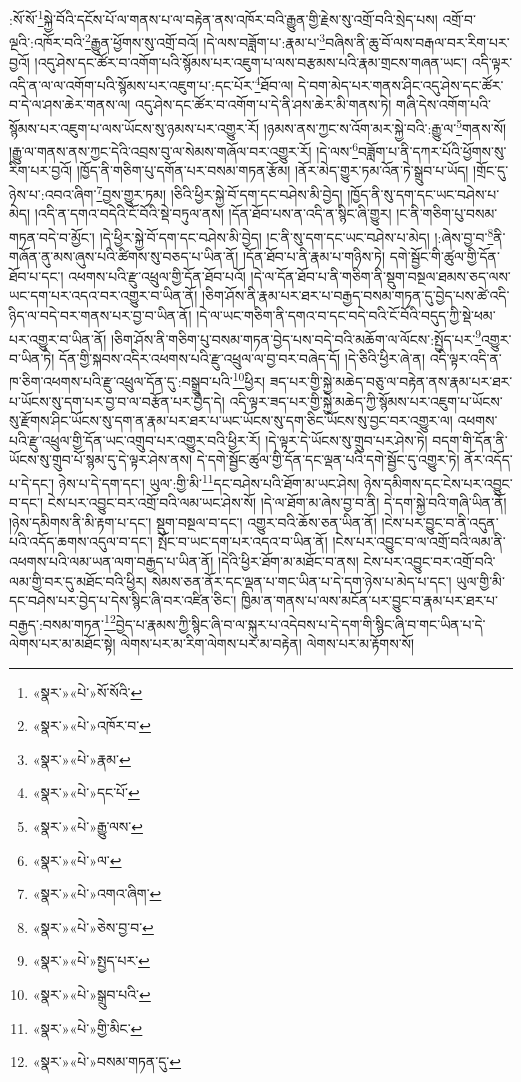 :སོ་སོ་\footnote{«སྣར་»«པེ་»སོ་སོའི་}སྐྱེ་བོའི་དངོས་པོ་ལ་གནས་པ་ལ་བརྟེན་ནས་འཁོར་བའི་རྒྱུན་གྱི་རྗེས་སུ་འགྲོ་བའི་སྲེད་པས། འགྲོ་བ་ལྔའི་:འཁོར་བའི་\footnote{«སྣར་»«པེ་»འཁོར་བ་}རྒྱུན་ཕྱོགས་སུ་འགྲོ་བའོ། །དེ་ལས་བཟློག་པ་:རྣམ་པ་\footnote{«སྣར་»«པེ་»རྣམ་}བཞིས་ནི་ཆུ་བོ་ལས་བརྒལ་བར་རིག་པར་བྱའོ། །འདུ་ཤེས་དང་ཚོར་བ་འགོག་པའི་སྙོམས་པར་འཇུག་པ་ལས་བརྩམས་པའི་རྣམ་གྲངས་གཞན་ཡང་། འདི་ལྟར་འདི་ན་ལ་ལ་འགོག་པའི་སྙོམས་པར་འཇུག་པ་:དང་པོར་\footnote{«སྣར་»«པེ་»དང་པོ་}ཐོབ་ལ། དེ་བག་མེད་པར་གནས་ཤིང་འདུ་ཤེས་དང་ཚོར་བ་དེ་ལ་ཤས་ཆེར་གནས་ལ། འདུ་ཤེས་དང་ཚོར་བ་འགོག་པ་དེ་ནི་ཤས་ཆེར་མི་གནས་ཏེ། གཞི་དེས་འགོག་པའི་སྙོམས་པར་འཇུག་པ་ལས་ཡོངས་སུ་ཉམས་པར་འགྱུར་རོ། །ཉམས་ནས་ཀྱང་ས་འོག་མར་སྐྱེ་བའི་:རྒྱུ་ལ་\footnote{«སྣར་»«པེ་»རྒྱུ་ལས་}གནས་སོ། །རྒྱུ་ལ་གནས་ནས་ཀྱང་དེའི་འབྲས་བུ་ལ་སེམས་གཞོལ་བར་འགྱུར་རོ། །དེ་ལས་\footnote{«སྣར་»«པེ་»ལ་}བཟློག་པ་ནི་དཀར་པོའི་ཕྱོགས་སུ་རིག་པར་བྱའོ། །ཁྱོད་ནི་གཅིག་པུ་དགོན་པར་བསམ་གཏན་རྩོམ། །ནོར་མེད་གྱུར་ཏམ་འོན་ཏེ་སྒྲུབ་པ་ཡོད། །གྲོང་དུ་ཉེས་པ་:འབའ་ཞིག་\footnote{«སྣར་»«པེ་»འགའ་ཞིག་}བྱས་གྱུར་ཏམ། །ཅིའི་ཕྱིར་སྐྱེ་བོ་དག་དང་བཤེས་མི་བྱེད། །ཁྱོད་ནི་སུ་དག་དང་ཡང་བཤེས་པ་མེད། །འདི་ན་དགའ་བདེའི་ངོ་བོའི་སྡེ་བཏུལ་ནས། །དོན་ཐོབ་པས་ན་འདི་ན་སྙིང་ཞི་གྱུར། །ང་ནི་གཅིག་པུ་བསམ་གཏན་བདེ་བ་མྱོང་། །དེ་ཕྱིར་སྐྱེ་བོ་དག་དང་བཤེས་མི་བྱེད། །ང་ནི་སུ་དག་དང་ཡང་བཤེས་པ་མེད། །:ཞེས་བྱ་བ་\footnote{«སྣར་»«པེ་»ཅེས་བྱ་བ་}ནི་གཞོན་ནུ་མས་ཞུས་པའི་ཚིགས་སུ་བཅད་པ་ཡིན་ནོ། །དོན་ཐོབ་པ་ནི་རྣམ་པ་གཉིས་ཏེ། དགེ་སྦྱོང་གི་ཚུལ་གྱི་དོན་ཐོབ་པ་དང་། འཕགས་པའི་རྫུ་འཕྲུལ་གྱི་དོན་ཐོབ་པའོ། །དེ་ལ་དོན་ཐོབ་པ་ནི་གཅིག་ནི་སྡུག་བསྔལ་ཐམས་ཅད་ལས་ཡང་དག་པར་འདའ་བར་འགྱུར་བ་ཡིན་ནོ། །ཅིག་ཤོས་ནི་རྣམ་པར་ཐར་པ་བརྒྱད་བསམ་གཏན་དུ་བྱེད་པས་ཚེ་འདི་ཉིད་ལ་བདེ་བར་གནས་པར་བྱ་བ་ཡིན་ནོ། །དེ་ལ་ཡང་གཅིག་ནི་དགའ་བ་དང་བདེ་བའི་ངོ་བོའི་བདུད་ཀྱི་སྡེ་ཕམ་པར་འགྱུར་བ་ཡིན་ནོ། །ཅིག་ཤོས་ནི་གཅིག་པུ་བསམ་གཏན་བྱེད་པས་བདེ་བའི་མཆོག་ལ་ལོངས་:སྤྱོད་པར་\footnote{«སྣར་»«པེ་»སྤྱད་པར་}འགྱུར་བ་ཡིན་ཏེ། དོན་གྱི་སྐབས་འདིར་འཕགས་པའི་རྫུ་འཕྲུལ་ལ་བྱ་བར་བཞེད་དོ། །དེ་ཅིའི་ཕྱིར་ཞེ་ན། འདི་ལྟར་འདི་ན་ཁ་ཅིག་འཕགས་པའི་རྫུ་འཕྲུལ་དོན་དུ་:བསྒྲུབ་པའི་\footnote{«སྣར་»«པེ་»སྒྲུབ་པའི་}ཕྱིར། ཟད་པར་གྱི་སྐྱེ་མཆེད་བཅུ་ལ་བརྟེན་ནས་རྣམ་པར་ཐར་པ་ཡོངས་སུ་དག་པར་བྱ་བ་ལ་བརྩོན་པར་བྱེད་དེ། འདི་ལྟར་ཟད་པར་གྱི་སྐྱེ་མཆེད་ཀྱི་སྙོམས་པར་འཇུག་པ་ཡོངས་སུ་རྫོགས་ཤིང་ཡོངས་སུ་དག་ན་རྣམ་པར་ཐར་པ་ཡང་ཡོངས་སུ་དག་ཅིང་ཡོངས་སུ་བྱང་བར་འགྱུར་ལ། འཕགས་པའི་རྫུ་འཕྲུལ་གྱི་དོན་ཡང་འགྲུབ་པར་འགྱུར་བའི་ཕྱིར་རོ། །དེ་ལྟར་དེ་ཡོངས་སུ་གྲུབ་པར་ཤེས་ཏེ། བདག་གི་དོན་ནི་ཡོངས་སུ་གྲུབ་པོ་སྙམ་དུ་དེ་ལྟར་ཤེས་ནས། དེ་དགེ་སྦྱོང་ཚུལ་གྱི་དོན་དང་ལྡན་པའི་དགེ་སྦྱོང་དུ་འགྱུར་ཏེ། ནོར་འདོད་པ་དེ་དང་། ཉེས་པ་དེ་དག་དང་། ཡུལ་:གྱི་མི་\footnote{«སྣར་»«པེ་»གྱི་མིང་}དང་བཤེས་པའི་ཐོག་མ་ཡང་ཤེས། ཉེས་དམིགས་དང་ངེས་པར་འབྱུང་བ་དང་། ངེས་པར་འབྱུང་བར་འགྲོ་བའི་ལམ་ཡང་ཤེས་སོ། །དེ་ལ་ཐོག་མ་ཞེས་བྱ་བ་ནི། དེ་དག་སྐྱེ་བའི་གཞི་ཡིན་ནོ། །ཉེས་དམིགས་ནི་མི་རྟག་པ་དང་། སྡུག་བསྔལ་བ་དང་། འགྱུར་བའི་ཆོས་ཅན་ཡིན་ནོ། །ངེས་པར་བྱུང་བ་ནི་འདུན་པའི་འདོད་ཆགས་འདུལ་བ་དང་། སྤོང་བ་ཡང་དག་པར་འདའ་བ་ཡིན་ནོ། །ངེས་པར་འབྱུང་བ་ལ་འགྲོ་བའི་ལམ་ནི་འཕགས་པའི་ལམ་ཡན་ལག་བརྒྱད་པ་ཡིན་ནོ། །དེའི་ཕྱིར་ཐོག་མ་མཐོང་བ་ནས། ངེས་པར་འབྱུང་བར་འགྲོ་བའི་ལམ་གྱི་བར་དུ་མཐོང་བའི་ཕྱིར། སེམས་ཅན་ནོར་དང་ལྡན་པ་གང་ཡིན་པ་དེ་དག་ཉེས་པ་མེད་པ་དང་། ཡུལ་གྱི་མི་དང་བཤེས་པར་བྱེད་པ་དེས་སྙིང་ཞི་བར་འཛིན་ཅིང་། ཁྱིམ་ན་གནས་པ་ལས་མངོན་པར་བྱུང་བ་རྣམ་པར་ཐར་པ་བརྒྱད་:བསམ་གཏན་\footnote{«སྣར་»«པེ་»བསམ་གཏན་དུ་}བྱེད་པ་རྣམས་ཀྱི་སྙིང་ཞི་བ་ལ་སྐུར་པ་འདེབས་པ་དེ་དག་གི་སྙིང་ཞི་བ་གང་ཡིན་པ་དེ་ལེགས་པར་མ་མཐོང་སྟེ། ལེགས་པར་མ་རིག་ལེགས་པར་མ་བརྟེན། ལེགས་པར་མ་རྟོགས་སོ། 